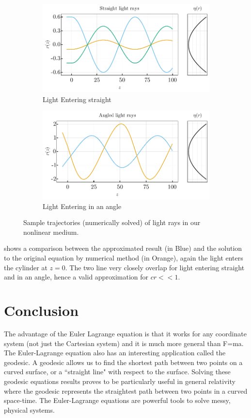 \documentclass[%
 amsmath,amssymb,
aps,
 fleqn,
 notitlepage,
]{revtex4-2}
\begin{document}
\begin{figure}
    \begin{subfigure}{.5\textwidth}
      \includegraphics[width=.9\linewidth]{ray_sim.pdf}
      \caption{Light Entering straight}
    \end{subfigure}%
    \begin{subfigure}{.5\textwidth}
      \includegraphics[width=.9\linewidth]{ray_sim_angled.pdf}
      \caption{Light Entering in an angle}
    \end{subfigure}
    \caption{Sample trajectories (numerically solved) of light rays in our nonlinear medium.}
    \label{fig: comp}
\end{figure}


 shows a comparison between the approximated result (in Blue) and the solution to the original equation by numerical method (in Orange), again the light enters the cylinder at $z=0$. The two line very closely overlap for light entering straight and in an angle, hence a valid approximation for $cr << 1$.

\section{Conclusion}

The advantage of the Euler Lagrange equation is that it works for any coordinate system (not just the Cartesian system) and it is much more general than F=ma. The Euler-Lagrange equation also has an interesting application called the geodesic. A geodesic allows us to find the shortest path between two points on a curved surface, or a “straight line" with respect to the surface. Solving these geodesic equations results proves to be particularly useful in general relativity where the geodesic represents the straightest path between two points in a curved space-time. The Euler-Lagrange equations are powerful tools to solve messy, physical systems.
\end{document}
